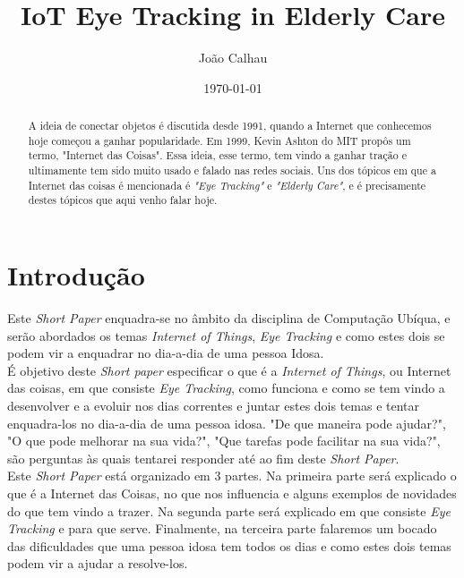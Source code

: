 \documentclass{llncs}
\begin{document}
\title{%
IoT Eye Tracking in Elderly Care}

\author{%
João Calhau}


\date{\today}

\maketitle{}

\begin{abstract}
A ideia de conectar objetos é discutida desde 1991, quando a Internet que conhecemos hoje começou a ganhar popularidade. Em 1999, Kevin Ashton do MIT propôs um termo, "Internet das Coisas". Essa ideia, esse termo, tem vindo a ganhar tração e ultimamente tem sido muito usado e falado nas redes sociais. Uns dos tópicos em que a Internet das coisas é mencionada é \textit{"Eye Tracking"} e \textit{"Elderly Care"}, e é precisamente destes tópicos que aqui venho falar hoje.
\end{abstract}


\section{Introdução}

Este \textit{Short Paper} enquadra-se no âmbito da disciplina de Computação Ubíqua, e serão abordados os temas \textit{Internet of Things}, \textit{Eye Tracking} e como estes dois se podem vir a enquadrar no dia-a-dia de uma pessoa Idosa.\\
\indent É objetivo deste \textit{Short paper} especificar o que é a \textit{Internet of Things}, ou Internet das coisas, em que consiste \textit{Eye Tracking}, como funciona e como se tem vindo a desenvolver e a evoluir nos dias correntes e juntar estes dois temas e tentar enquadra-los no dia-a-dia de uma pessoa idosa. "De que maneira pode ajudar?", "O que pode melhorar na sua vida?", "Que tarefas pode facilitar na sua vida?", são perguntas às quais tentarei responder até ao fim deste \textit{Short Paper}.\\
\indent Este \textit{Short Paper} está organizado em 3 partes. Na primeira parte será explicado o que é a Internet das Coisas, no que nos influencia e alguns exemplos de novidades do que tem vindo a trazer. Na segunda parte será explicado em que consiste \textit{Eye Tracking} e para que serve. Finalmente, na terceira parte falaremos um bocado das dificuldades que uma pessoa idosa tem todos os dias e como estes dois temas podem vir a ajudar a resolve-los.\\ 
\end{document}
